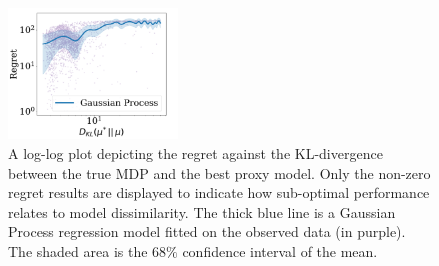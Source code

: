 \begin{figure}[t!]
    \centering
    \includegraphics[width=0.4\textwidth]{img/alpha_norms}
    \caption{A log-log plot depicting the regret against the KL-divergence between the true MDP and the best proxy model. Only the non-zero regret results are displayed to indicate how sub-optimal performance relates to model dissimilarity. The thick blue line is a Gaussian Process regression model fitted on the observed data (in purple). The shaded area is the $68\%$ confidence interval of the mean.}
    \label{fig:norms}
\end{figure}
